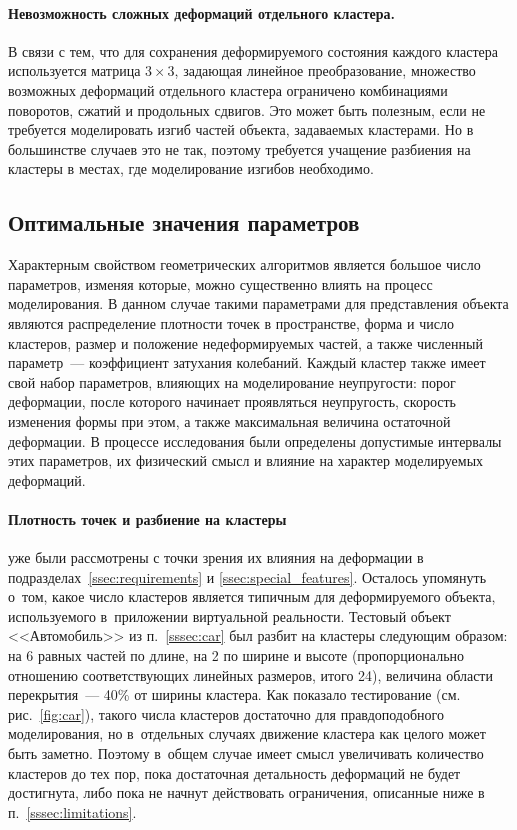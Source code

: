 \documentclass[a4paper, 14pt, titlepage]{extarticle}
\begin{document}
      \paragraph{Невозможность сложных деформаций отдельного кластера.} В связи с тем, что для сохранения
      деформируемого состояния каждого кластера используется матрица $3 \times 3$, задающая
      линейное преобразование, множество возможных деформаций отдельного кластера ограничено комбинациями
      поворотов, сжатий и продольных сдвигов. Это может быть полезным, если не требуется
      моделировать изгиб частей объекта, задаваемых кластерами. Но в большинстве случаев это не
      так, поэтому требуется учащение разбиения на кластеры в местах, где моделирование
      изгибов необходимо.

    \subsection{Оптимальные значения параметров}\label{ssec:optimal_parameters}

      Характерным свойством геометрических алгоритмов является большое число параметров, изменяя
      которые, можно существенно влиять на процесс моделирования.  В данном случае такими
      параметрами для представления объекта являются распределение плотности точек в
      пространстве, форма и число кластеров, размер и положение недеформируемых частей, а также
      численный параметр~--- коэффициент затухания колебаний. Каждый кластер также имеет свой набор
      параметров, влияющих на моделирование неупругости: порог деформации, после которого начинает
      проявляться неупругость, скорость изменения формы при этом, а также максимальная величина
      остаточной деформации. В процессе исследования были определены допустимые интервалы этих
      параметров, их физический смысл и влияние на характер моделируемых деформаций.

      \paragraph{Плотность точек и разбиение на кластеры} уже были рассмотрены с точки зрения
      их влияния на деформации в подразделах~\ref{ssec:requirements} и \ref{ssec:special_features}.
      Осталось упомянуть о~том, какое число кластеров является типичным для
      деформируемого объекта, используемого в~приложении виртуальной реальности. Тестовый
      объект <<Автомобиль>> из п.~\ref{sssec:car} был разбит на кластеры следующим образом: на 6
      равных частей по длине, на 2 по ширине и высоте (пропорционально отношению соответствующих
      линейных размеров, итого 24), величина области перекрытия~--- 40\% от ширины кластера.
      Как показало тестирование (см. рис.~\ref{fig:car}), такого числа кластеров достаточно для правдоподобного моделирования, но
      в~отдельных случаях движение кластера как целого может быть заметно. Поэтому в~общем случае
      имеет смысл увеличивать количество кластеров до тех пор, пока достаточная детальность
      деформаций не будет достигнута, либо пока не начнут действовать ограничения, описанные ниже в
      п.~\ref{sssec:limitations}.
\end{document}
